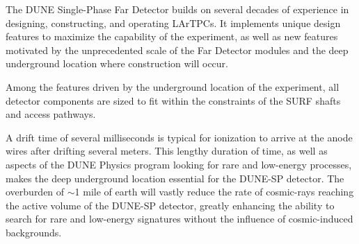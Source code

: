 The DUNE Single-Phase Far Detector builds on several decades of experience in designing, constructing, and operating LArTPCs.  It implements unique design features to maximize the capability of the experiment, as well as new features motivated by the unprecedented scale of the Far Detector modules and the deep underground location where construction will occur.

Among the features driven by the underground location of the experiment, all detector components are sized to fit within the constraints of the SURF shafts and access pathways.

A drift time of several milliseconds is typical for ionization to arrive at the anode wires after drifting several meters.  This lengthy duration of time, as well as aspects of the DUNE Physics program looking for rare and low-energy processes, makes the deep underground location essential for the DUNE-SP detector.  The overburden of $\sim$1 mile of earth will vastly reduce the rate of cosmic-rays reaching the active volume of the DUNE-SP detector, greatly enhancing the ability to search for rare and low-energy signatures without the influence of cosmic-induced backgrounds.  







